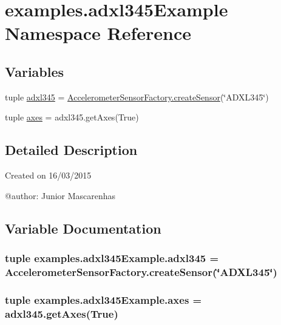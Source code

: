 \hypertarget{namespaceexamples_1_1adxl345Example}{}\section{examples.\+adxl345\+Example Namespace Reference}
\label{namespaceexamples_1_1adxl345Example}
\subsection*{Variables}
\begin{DoxyCompactItemize}
\item 
tuple \hyperlink{namespaceexamples_1_1adxl345Example_acbf1ab53a4f4f5ca9ff7d8350ef22eed}{adxl345} = \hyperlink{classconcretefactory_1_1accelerometerSensorFactory_1_1AccelerometerSensorFactory_acc779765811f2da3b7a212550936b63b}{Accelerometer\+Sensor\+Factory.\+create\+Sensor}(\char`\"{}A\+D\+X\+L345\char`\"{})
\item 
tuple \hyperlink{namespaceexamples_1_1adxl345Example_ac627645bad1f9994a1c3328734da0ae8}{axes} = adxl345.\+get\+Axes(True)
\end{DoxyCompactItemize}


\subsection{Detailed Description}
\begin{DoxyVerb}Created on 16/03/2015

@author: Junior Mascarenhas
\end{DoxyVerb}
 

\subsection{Variable Documentation}
\hypertarget{namespaceexamples_1_1adxl345Example_acbf1ab53a4f4f5ca9ff7d8350ef22eed}{}
\subsubsection[{adxl345}]{\setlength{\rightskip}{0pt plus 5cm}tuple examples.\+adxl345\+Example.\+adxl345 = {\bf Accelerometer\+Sensor\+Factory.\+create\+Sensor}(\char`\"{}A\+D\+X\+L345\char`\"{})}\label{namespaceexamples_1_1adxl345Example_acbf1ab53a4f4f5ca9ff7d8350ef22eed}
\hypertarget{namespaceexamples_1_1adxl345Example_ac627645bad1f9994a1c3328734da0ae8}{}
\subsubsection[{axes}]{\setlength{\rightskip}{0pt plus 5cm}tuple examples.\+adxl345\+Example.\+axes = adxl345.\+get\+Axes(True)}\label{namespaceexamples_1_1adxl345Example_ac627645bad1f9994a1c3328734da0ae8}
